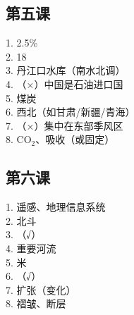 \documentclass[a4paper,12pt]{ctexart}
\begin{document}
\subsection*{第五课}
1. 2.5\%\\
2. 18\\
3. 丹江口水库（南水北调）\\
4. （×）中国是石油进口国\\
5. 煤炭\\
6. 西北（如甘肃/新疆/青海）\\
7. （×）集中在东部季风区\\
8. CO$_2$、吸收（或固定）

\subsection*{第六课}
1. 遥感、地理信息系统\\
2. 北斗\\
3. （√）\\
4. 重要河流\\
5. 米\\
6. （√）\\
7. 扩张（变化）\\
8. 褶皱、断层
\end{document}
